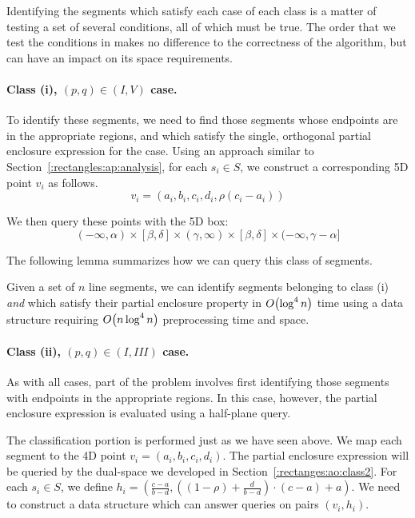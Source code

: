 Identifying the segments which satisfy each case of each class is a matter of testing a set of several conditions, all of which must be true. The order that we test the conditions in makes no difference to the correctness of the algorithm, but can have an impact on its space requirements.

\paragraph{Class (i), $(p, q) \in (I, V)$ case.} 
To identify these segments, we need to find those segments whose endpoints are in the appropriate regions, and which satisfy the single, orthogonal partial enclosure expression for the case. 
Using an approach similar to Section~\ref{:rectangles:ap:analysis}, for each $s_i \in S$, we construct a corresponding 5D point $v_i$ as follows.
\[
v_i = (a_i, b_i, c_i, d_i, \rho(c_i - a_i))
\]

\noindent We then query these points with the 5D box:
\[
(-\infty, \alpha) \times [\beta, \delta] \times (\gamma, \infty) \times [\beta, \delta] \times (-\infty, \gamma - \alpha]
\]

\noindent The following lemma summarizes how we can query this class of segments.

\begin{lemma}
\label{lem:ao:class1:v}
Given a set of $n$ line segments, we can identify segments belonging to class (i) \emph{and} which satisfy their partial enclosure property in $O\!\left(\log^4{n}\right)$ time using a data structure requiring $O\!\left(n\log^4{n}\right)$ preprocessing time and space.
\end{lemma}

\paragraph{Class (ii), $(p, q) \in (I, III)$ case.} 
As with all cases, part of the problem involves first identifying those segments with endpoints in the appropriate regions.
In this case, however, the partial enclosure expression is evaluated using a half-plane query.

The classification portion is performed just as we have seen above. We map each segment to the 4D point $v_i = ( a_i, b_i, c_i, d_i )$.
The partial enclosure expression will be queried by the dual-space we developed in Section~\ref{:rectanges:ao:class2}. 
For each $s_i \in S$, we define $h_i = \left ( \frac{c - a}{b - d}, \left ( (1 - \rho) + \frac{d}{b-d} \right ) \cdot (c-a) + a \right )$.
We need to construct a data structure which can answer queries on pairs $(v_i, h_i)$.

